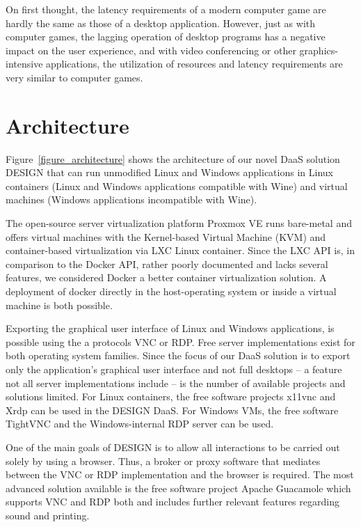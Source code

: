 \documentclass[runningheads]{llncs}
\begin{document}
On first thought, the latency requirements of a modern computer game are hardly the same as those of a desktop application. However, just as with computer games, the lagging operation of desktop programs has a negative impact on the user experience, and with video conferencing or other graphics-intensive applications, the utilization of resources and latency requirements are very similar to computer games.

\section{Architecture}
\label{sec:RecommendDaaSarchitecture}
% 

Figure~\ref{figure_architecture} shows the architecture of our novel DaaS solution DESIGN that can run unmodified Linux and Windows applications in Linux containers (Linux and Windows applications compatible with Wine) and virtual machines (Windows applications incompatible with Wine).

The open-source server virtualization platform Proxmox VE runs bare-metal and offers virtual machines with the Kernel-based Virtual Machine (KVM) and container-based virtualization via LXC Linux container. Since the LXC API is, in comparison to the Docker API, rather poorly documented and lacks several features, we considered Docker a better container virtualization solution. A deployment of docker directly in the host-operating system or inside a virtual machine is both possible.

Exporting the graphical user interface of Linux and Windows applications, is possible using the a protocols VNC or RDP. Free server implementations exist for both operating system families. Since the focus of our DaaS solution is to export only the application's graphical user interface and not full desktops -- a feature not all server implementations include -- is the number of available projects and solutions limited. For Linux containers, the free software projects x11vnc and Xrdp can be used in the DESIGN DaaS. For Windows VMs, the free software TightVNC and the Windows-internal RDP server can be used.

One of the main goals of DESIGN is to allow all interactions to be carried out solely by using a browser. Thus, a broker or proxy software that mediates between the VNC or RDP implementation and the browser is required. The most advanced solution available is the free software project Apache Guacamole which supports VNC and RDP both and includes further relevant features regarding sound and printing.
\end{document}
